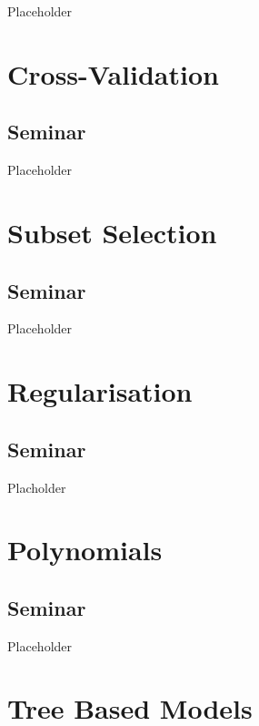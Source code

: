 \documentclass[]{article}
\begin{document}
Placeholder

\hypertarget{cross-validation}{%
\section{Cross-Validation}\label{cross-validation}}

\hypertarget{seminar-1}{%
\subsection{Seminar}\label{seminar-1}}

Placeholder

\hypertarget{subset-selection}{%
\section{Subset Selection}\label{subset-selection}}

\hypertarget{seminar-2}{%
\subsection{Seminar}\label{seminar-2}}

Placeholder

\hypertarget{regularisation}{%
\section{Regularisation}\label{regularisation}}

\hypertarget{seminar-3}{%
\subsection{Seminar}\label{seminar-3}}

Placholder

\hypertarget{polynomials}{%
\section{Polynomials}\label{polynomials}}

\hypertarget{seminar-4}{%
\subsection{Seminar}\label{seminar-4}}

Placeholder

\hypertarget{tree-based-models}{%
\section{Tree Based Models}\label{tree-based-models}}
\end{document}
